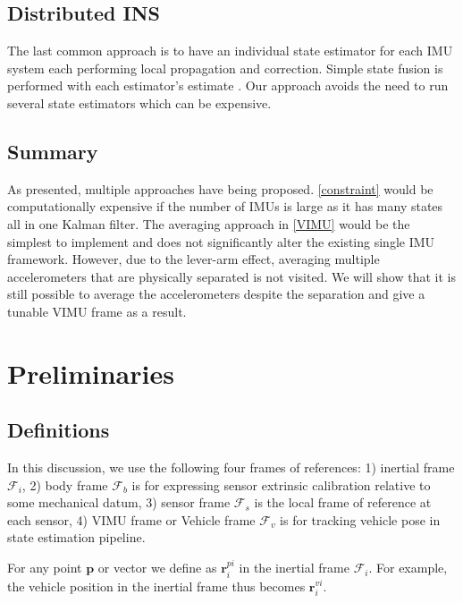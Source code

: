 \documentclass[conference]{IEEEtran}
\begin{document}
\subsection{Distributed INS}\label{distributed}

The last common approach is to have an individual state estimator for each IMU system each performing local propagation and correction. Simple state fusion is performed with each estimator's estimate \cite{Bancroft2011DataFA, patel2022_multi-imu}. Our approach avoids the need to run several state estimators which can be expensive.

\subsection{Summary}

As presented, multiple approaches have being proposed. \ref{constraint} would be computationally expensive if the number of IMUs is large as it has many states all in one Kalman filter. The averaging approach in \ref{VIMU} would be the simplest to implement and does not significantly alter the existing single IMU framework. However, due to the lever-arm effect, averaging multiple accelerometers that are physically separated is not visited. We will show that it is still possible to average the accelerometers despite the separation and give a tunable VIMU frame as a result.

\section{Preliminaries}

\subsection{Definitions}

In this discussion, we use the following four frames of references: 1) inertial frame $\bm{\mathcal{F}}_i$, 2) body frame $\bm{\mathcal{F}}_b$ is for expressing sensor extrinsic calibration relative to some mechanical datum, 3) sensor frame $\bm{\mathcal{F}}_s$ is the local frame of reference at each sensor, 4) VIMU frame or Vehicle frame $\bm{\mathcal{F}}_v$ is for tracking vehicle pose in state estimation pipeline.

For any point $\textbf{p}$ or vector we define as $\textbf{r}_i^{pi}$ in the inertial frame $\bm{\mathcal{F}}_i$. For example, the vehicle position in the inertial frame thus becomes $\textbf{r}_i^{vi}$.
\end{document}
